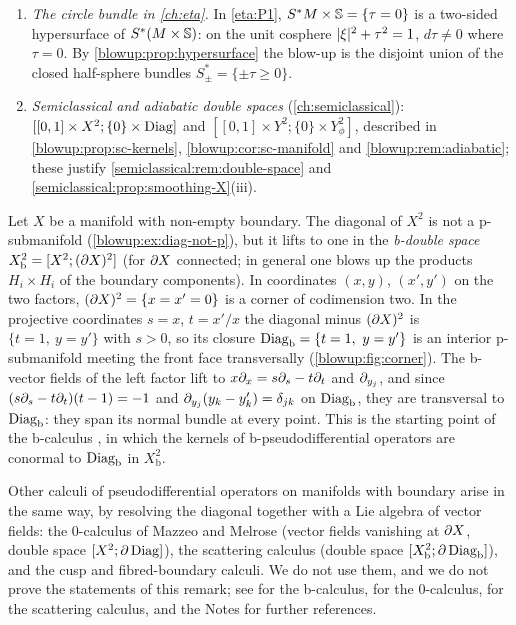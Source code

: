 \begin{enumerate}[label=(\arabic*),leftmargin=*]
$W/V=T^*(\tilde M/M)$.
\item \emph{The circle bundle in \cref{ch:eta}.} In \ref{eta:P1}, $S^*M\times\mathbb{S}=
\{\tau=0\}$ is a two-sided hypersurface of $S^*(M\times\mathbb{S})$: on the unit cosphere
$\lvert \xi\rvert^2+\tau^2=1$, $d\tau\ne0$ where $\tau=0$. By \cref{blowup:prop:hypersurface} the
blow-up is the disjoint union of the closed half-sphere bundles $S^*_\pm=\{\pm\tau\ge0\}$.
\item \emph{Semiclassical and adiabatic double spaces} (\cref{ch:semiclassical}):
$[[0,1]\times X^2;\{0\}\times\operatorname{Diag}]$ and $[[0,1]\times Y^2;\{0\}\times Y^2_\phi]$, described in
\cref{blowup:prop:sc-kernels}, \cref{blowup:cor:sc-manifold} and
\cref{blowup:rem:adiabatic}; these justify \cref{semiclassical:rem:double-space} and
\cref{semiclassical:prop:smoothing-X}(iii).
\end{enumerate}

\begin{example}\label{blowup:exa:b-double}
Let $X$ be a manifold with non-empty boundary. The diagonal of $X^2$ is not a p-submanifold
(\cref{blowup:ex:diag-not-p}), but it lifts to one in the \emph{b-double space}
$X^2_{\mathrm b}=[X^2;(\partial X)^2]$ (for $\partial X$ connected; in general one blows up the
products $H_i\times H_i$ of the boundary components). In coordinates $(x,y)$, $(x',y')$
on the two factors, $(\partial X)^2=\{x=x'=0\}$ is a corner of codimension two. In the
projective coordinates $s=x$, $t=x'/x$ the diagonal minus $(\partial X)^2$ is $\{t=1,\ y=y'\}$
with $s>0$, so its closure $\Diag_{\mathrm b}=\{t=1,\ y=y'\}$ is an interior p-submanifold
meeting the front face transversally (\cref{blowup:fig:corner}). The b-vector fields of the
left factor lift to $x\partial_x=s\partial_s-t\partial_t$ and $\partial_{y_j}$, and since
$(s\partial_s-t\partial_t)(t-1)=-1$ and $\partial_{y_j}(y_k-y'_k)=\delta_{jk}$ on $\operatorname{Diag}_{\mathrm b}$, they are
transversal to $\operatorname{Diag}_{\mathrm b}$: they span its normal bundle at every point. This is the
starting point of the b-calculus \cite{Melrose-APS}, in which the kernels of
b-pseudodifferential operators are conormal to $\operatorname{Diag}_{\mathrm b}$ in $X^2_{\mathrm b}$.
\end{example}

\begin{remark}\label{blowup:rem:other-calculi}
Other calculi of pseudodifferential operators on manifolds with boundary arise in the
same way, by resolving the diagonal together with a Lie algebra of vector fields: the
$0$-calculus of Mazzeo and Melrose (vector fields vanishing at $\partial X$, double space
$[X^2;\partial\operatorname{Diag}]$), the scattering calculus (double space $[X^2_{\mathrm b};\partial\operatorname{Diag}_{\mathrm b}]$),
and the cusp and fibred-boundary calculi. We do not use them, and we do not prove the
statements of this remark; see \cite{Melrose-APS} for the b-calculus,
\cite{Mazzeo-Melrose} for the $0$-calculus, \cite{Melrose-scattering} for the scattering
calculus, and the Notes for further references.
\end{remark}

